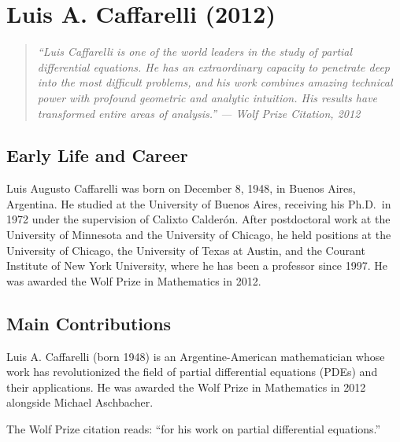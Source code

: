 \providecommand{\curl}{\operatorname{curl}}

\chapter{Luis A. Caffarelli (2012)}

\begin{quote}
\it ``Luis Caffarelli is one of the world leaders in the study of partial differential equations. He has an extraordinary capacity to penetrate deep into the most difficult problems, and his work combines amazing technical power with profound geometric and analytic intuition. His results have transformed entire areas of analysis.'' --- Wolf Prize Citation, 2012
\end{quote}

\section{Early Life and Career}

Luis Augusto Caffarelli was born on December 8, 1948, in Buenos Aires, Argentina. He studied at the University of Buenos Aires, receiving his Ph.D.\ in 1972 under the supervision of Calixto Calderón. After postdoctoral work at the University of Minnesota and the University of Chicago, he held positions at the University of Chicago, the University of Texas at Austin, and the Courant Institute of New York University, where he has been a professor since 1997. He was awarded the Wolf Prize in Mathematics in 2012.

\section{Main Contributions}

Luis A. Caffarelli (born 1948) is an Argentine-American mathematician whose work has revolutionized the field of partial differential equations (PDEs) and their applications. He was awarded the Wolf Prize in Mathematics in 2012 alongside Michael Aschbacher.

The Wolf Prize citation reads: ``for his work on partial differential equations.''

